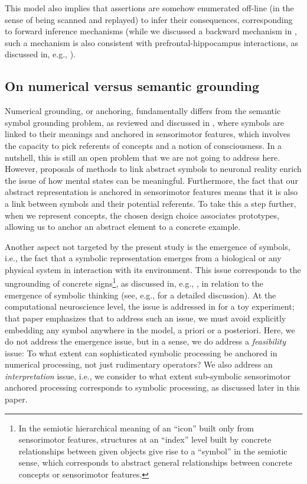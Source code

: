 \documentclass[sn-mathphys]{sn-jnl}
\begin{document}
This model also implies that assertions are somehow enumerated off-line (in the sense of being scanned and replayed) to infer their consequences, corresponding to forward inference mechanisms (while we discussed a backward mechanism in \cite{mercier_ontology_2021}, such a mechanism is also consistent with prefrontal-hippocampus interactions, as discussed in, e.g., \cite{santos-pata_entorhinal_2021}).

\subsection{On numerical versus semantic grounding}

Numerical grounding, or anchoring, fundamentally differs from the semantic symbol grounding problem, as reviewed and discussed in \cite{taddeo_solving_2005}, where symbols are linked to their meanings and anchored in sensorimotor features, which involves the capacity to pick referents of concepts and a notion of consciousness. In a nutshell, this is still an open problem that we are not going to address here. However, proposals of methods to link abstract symbols to neuronal reality enrich the issue of how mental states can be meaningful. Furthermore, the fact that our abstract representation is anchored in sensorimotor features means that it is also a link between symbols and their potential referents. To take this a step further, when we represent concepts, the chosen design choice associates prototypes, allowing us to anchor an abstract element to a concrete example.

Another aspect not targeted by the present study is the emergence of symbols, i.e., the fact that a symbolic representation emerges from a biological or any physical system in interaction with its environment. This issue corresponds to the ungrounding of concrete signs\footnote{In the semiotic hierarchical meaning of an ``icon'' built only from sensorimotor features, structures at an ``index'' level built by concrete relationships between given objects give rise to a ``symbol'' in the semiotic sense, which corresponds to abstract general relationships between concrete concepts or sensorimotor features.}, as discussed in, e.g., \cite{raczaszek-leonardi_ungrounding_2018}, in relation to the emergence of symbolic thinking (see, e.g., \cite{villiers_why_2007} for a detailed discussion). At the computational neuroscience level, the issue is addressed in \cite{rougier_implicit_2009} for a toy experiment; that paper emphasizes that to address such an issue, we must avoid explicitly embedding any symbol anywhere in the model, a priori or a posteriori. Here, we do not address the emergence issue, but in a sense, we do address a {\em feasibility} issue: To what extent can sophisticated symbolic processing be anchored in numerical processing, not just rudimentary operators? We also address an {\em interpretation} issue, i.e., we consider to what extent sub-symbolic sensorimotor anchored processing corresponds to symbolic processing, as discussed later in this paper.
\end{document}
